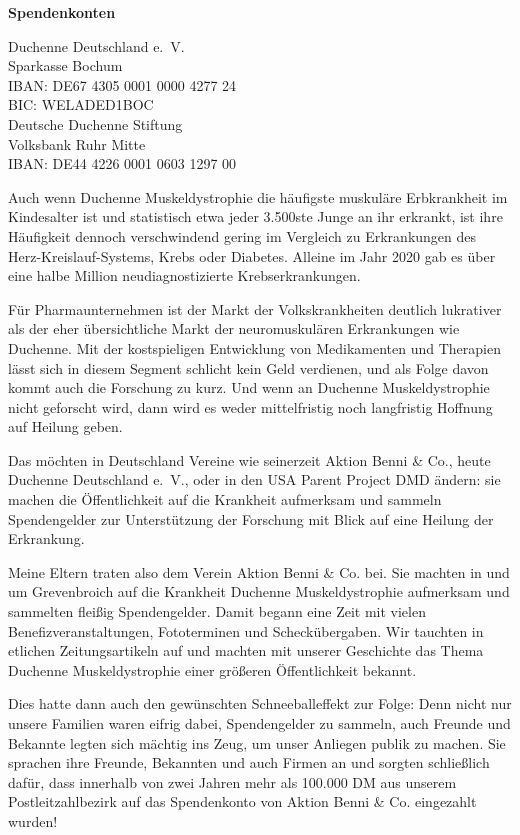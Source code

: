 \documentclass[fontsize=14pt,a4paper,headinclude,DIV=calc,automark]{scrbook}
\begin{document}
\begin{mdframed}
\vspace{0.8\baselineskip}
\textbf{Spendenkonten}

Duchenne Deutschland e.~V.\\
Sparkasse Bochum\\
IBAN: DE67 4305 0001 0000 4277 24\\
BIC: WELADED1BOC\\
Deutsche Duchenne Stiftung\\
Volksbank Ruhr Mitte\\
IBAN: DE44 4226 0001 0603 1297 00

\end{mdframed}

\vspace{0.8\baselineskip}

\noindent Auch wenn Duchenne Muskeldystrophie die häufigste muskuläre Erbkrankheit im Kindesalter ist und statistisch etwa jeder 3.500ste Junge an ihr erkrankt, ist ihre Häufigkeit dennoch verschwindend gering im Vergleich zu Erkrankungen des Herz-Kreislauf-Systems, Krebs oder Diabetes. Alleine im Jahr 2020 gab es über eine halbe Million neudiagnostizierte Krebserkrankungen.

Für Pharmaunternehmen ist der Markt der Volkskrankheiten deutlich lukrativer als der eher übersichtliche Markt der neuromuskulären Erkrankungen wie Duchenne. Mit der kostspieligen Entwicklung von Medikamenten und Therapien lässt sich in diesem Segment schlicht kein Geld verdienen, und als Folge davon kommt auch die Forschung zu kurz. Und wenn an Duchenne Muskeldystrophie nicht geforscht wird, dann wird es weder mittelfristig noch langfristig Hoffnung auf Heilung geben.

Das möchten in Deutschland Vereine wie seinerzeit Aktion Benni \& Co., heute Duchenne Deutschland e.~V., oder in den USA Parent Project DMD ändern: sie machen die Öffentlichkeit auf die Krankheit aufmerksam und sammeln Spendengelder zur Unterstützung der Forschung mit Blick auf eine Heilung der Erkrankung.

Meine Eltern traten also dem Verein Aktion Benni \& Co. bei. Sie machten in und um Grevenbroich auf die Krankheit Duchenne Muskeldystrophie aufmerksam und sammelten fleißig Spendengelder. Damit begann eine Zeit mit vielen Benefizveranstaltungen, Fototerminen und Scheckübergaben. Wir tauchten in etlichen Zeitungsartikeln auf und machten mit unserer Geschichte das Thema Duchenne Muskeldystrophie einer größeren Öffentlichkeit bekannt.

Dies hatte dann auch den gewünschten Schneeballeffekt zur Folge: Denn nicht nur unsere Familien waren eifrig dabei, Spendengelder zu sammeln, auch Freunde und Bekannte legten sich mächtig ins Zeug, um unser Anliegen publik zu machen. Sie sprachen ihre Freunde, Bekannten und auch Firmen an und sorgten schließlich dafür, dass innerhalb von zwei Jahren mehr als 100.000 DM aus unserem Postleitzahlbezirk auf das Spendenkonto von Aktion Benni \& Co. eingezahlt wurden!
\end{document}
